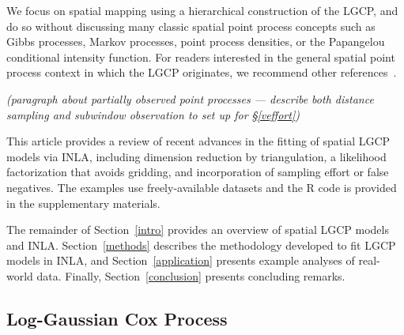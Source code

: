 \documentclass[]{interact}
\begin{document}
We focus on spatial mapping using a hierarchical construction of the LGCP, and
do so without discussing many classic spatial point process concepts such as
Gibbs processes, Markov processes, point process densities, or the Papangelou
conditional intensity function. For readers interested in the general spatial
point process context in which the LGCP originates, we recommend other
references~\cite{moellerwaagepetersen, digglepoint, cressie}.

{\it (paragraph about partially observed point processes --- describe both
distance sampling and subwindow observation to set up for \S\ref{veffort})}


This article provides a review of recent advances in the fitting of spatial
LGCP models via INLA, including dimension reduction by triangulation, a
likelihood factorization that avoids gridding, and incorporation of sampling
effort or false negatives. The examples use freely-available datasets and the
R code is provided in the supplementary materials.

The remainder of Section~\ref{intro} provides an overview of spatial LGCP
models and INLA. Section~\ref{methods} describes the methodology developed to
fit LGCP models in INLA, and Section~\ref{application} presents example
analyses of real-world data. Finally, Section~\ref{conclusion} presents
concluding remarks.


\subsection{Log-Gaussian Cox Process}
\label{lgcp}




\end{document}
